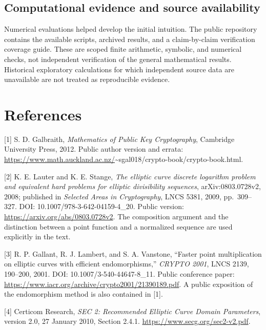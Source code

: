 \documentclass[
  11pt,
  a4paper,
]{article}
\begin{document}
\subsection{Computational evidence and source
availability}\label{computational-evidence-and-source-availability}

Numerical evaluations helped develop the initial intuition. The public
repository contains the available scripts, archived results, and a
claim-by-claim verification coverage guide. These are scoped finite
arithmetic, symbolic, and numerical checks, not independent verification
of the general mathematical results. Historical exploratory calculations
for which independent source data are unavailable are not treated as
reproducible evidence.

\section{References}\label{references}

{[}1{]} S. D. Galbraith, \emph{Mathematics of Public Key Cryptography},
Cambridge University Press, 2012. Public author version and errata:
\url{https://www.math.auckland.ac.nz/}\textasciitilde sgal018/crypto-book/crypto-book.html.

{[}2{]} K. E. Lauter and K. E. Stange, \emph{The elliptic curve discrete
logarithm problem and equivalent hard problems for elliptic divisibility
sequences}, arXiv:0803.0728v2, 2008; published in \emph{Selected Areas
in Cryptography}, LNCS 5381, 2009, pp.~309--327. DOI:
10.1007/978-3-642-04159-4\_20. Public version:
\url{https://arxiv.org/abs/0803.0728v2}. The composition argument and the
distinction between a point function and a normalized sequence are used
explicitly in the text.

{[}3{]} R. P. Gallant, R. J. Lambert, and S. A. Vanstone, ``Faster point
multiplication on elliptic curves with efficient endomorphisms,''
\emph{CRYPTO 2001}, LNCS 2139, 190--200, 2001. DOI:
10.1007/3-540-44647-8\_11. Public conference paper:
\url{https://www.iacr.org/archive/crypto2001/21390189.pdf}. A public
exposition of the endomorphism method is also contained in {[}1{]}.

{[}4{]} Certicom Research, \emph{SEC 2: Recommended Elliptic Curve
Domain Parameters}, version 2.0, 27 January 2010, Section 2.4.1.
\url{https://www.secg.org/sec2-v2.pdf}.
\end{document}
